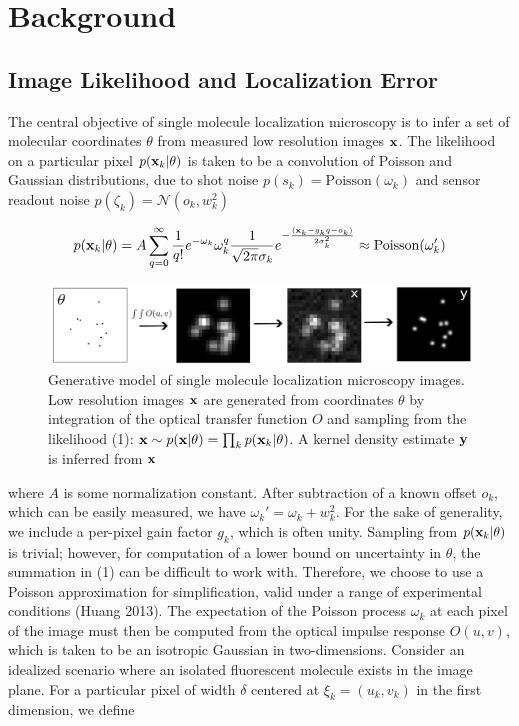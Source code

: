 \documentclass{article}
\begin{document}
\section{Background}

\subsection{Image Likelihood and Localization Error}

The central objective of single molecule localization microscopy is to infer a set of molecular coordinates $\theta$ from measured low resolution images $\bold{x}$. The likelihood on a particular pixel $p(\bold{x}_k|\theta)$ is taken to be a convolution of Poisson and Gaussian distributions, due to shot noise $p(s_{k}) = \mathrm{Poisson}(\omega_{k})$ and sensor readout noise $p(\zeta_{k}) = \mathcal{N}(o_{k},w_{k}^{2})$ 

\begin{equation}
p(\bold{x}_{k}|\theta) = A\sum_{q=0}^{\infty} \frac{1}{q!}e^{-\omega_{k}}\omega_{k}^{q}\frac{1}{\sqrt{2\pi}\sigma_{k}}e^{-\frac{(\bold{x}_{k}-g_{k}q-o_{k})}{2\sigma_{k}^{2}}} \approx \mathrm{Poisson}(\omega_{k}')
\end{equation}


\begin{figure}
\includegraphics[scale=0.225]{Generation.png}
\caption{Generative model of single molecule localization microscopy images. Low resolution images $\bold{x}$ are generated from coordinates $\theta$ by integration of the optical transfer function $O$ and sampling from the likelihood (1): $\bold{x}\sim p(\bold{x}|\theta) = \prod_{k} p(\bold{x}_k|\theta)$. A kernel density estimate $\bold{y}$ is inferred from $\bold{x}$}
\end{figure}

where $A$ is some normalization constant. After subtraction of a known offset $o_{k}$, which can be easily measured, we have $\omega_{k}' = \omega_{k} + w_{k}^{2}$. For the sake of generality, we include a per-pixel gain factor $g_{k}$, which is often unity. Sampling from $p(\bold{x}_{k}|\theta)$ is trivial; however, for computation of a lower bound on uncertainty in $\theta$, the summation in (1) can be difficult to work with. Therefore, we choose to use a Poisson approximation for simplification, valid under a range of experimental conditions (Huang 2013). The expectation of the Poisson process $\omega_{k}$ at each pixel of the image must then be computed from the optical impulse response $O(u,v)$, which is taken to be an isotropic Gaussian in two-dimensions. Consider an idealized scenario where an isolated fluorescent molecule exists in the image plane. For a particular pixel of width $\delta$ centered at $\xi_{k}=(u_k,v_k)$ in the first dimension, we define
\end{document}
